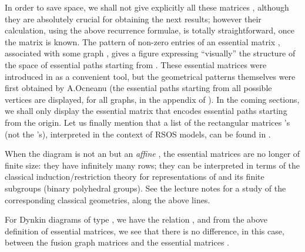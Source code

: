 \documentclass[a4paper,11pt]{article}
\begin{document}
In order to save space, we shall not give explicitly all these
matrices \coordHE{}, although
they are absolutely crucial for obtaining the next results;
however their calculation,
using the above recurrence formulae, is totally straightforward, once
the matrix
\coordHE{} is known.
The pattern of non-zero entries of an essential matrix \coordHE{},
associated with some
graph \coordHE{},
gives a figure expressing ``visually'' the structure of the space of
essential paths
starting
from \coordHE{}. These essential matrices were introduced in \cite{Coque:qtetra} as a
convenient
tool, but the geometrical patterns themselves were first obtained  by
A.Ocneanu (the essential paths starting from all possible vertices
are displayed, for all \coordHE{} graphs, in the appendix of
\cite{Ocneanu:paths}).  In the coming sections, we shall only display the
essential matrix \coordHE{} that encodes essential paths starting from the
origin. Let us finally mention that a list of
the rectangular matrices \coordHE{}'s (not the \coordHE{}'s), interpreted 
in the context of RSOS models, can be found in
\cite{PearceZhou:RSOS}.


When the diagram is not an \coordHE{} but an {\sl affine} \coordHE{}, the
essential matrices are no longer of finite size: they have infinitely
many rows; they can be interpreted in terms of the classical
induction/restriction theory for representations of \coordHE{} and
its finite subgroups (binary polyhedral groups). See the lecture notes
\cite{Coque:Karpacz} for a study of the corresponding classical geometries,
along the above lines.


For Dynkin diagrams of type \coordHE{}, we have the relation
\coordHE{},
and from the above definition of essential matrices, we see that
there is no difference, in this case, between the
fusion graph matrices \coordHE{} and the essential matrices \coordHE{}.
\end{document}
